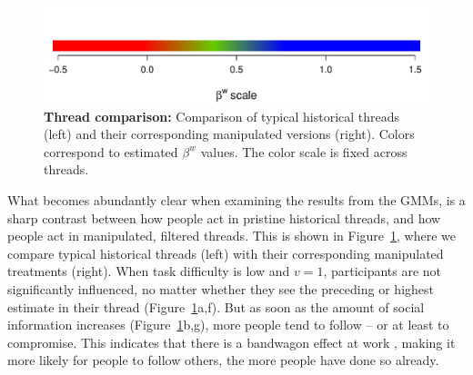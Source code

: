 \documentclass[9pt,a4paper,twocolumn,lineno]{article}
\begin{document}
\begin{figure}
	\includegraphics[width=.5\linewidth]{betascale_horizontal}

	
	\caption{\footnotesize \textbf{Thread comparison:} Comparison of typical historical threads (left) and their corresponding manipulated versions (right). %
	Colors correspond to estimated $\beta^w$ values. The color scale is fixed across threads.}
\label{fig:more}
\end{figure}

What becomes abundantly clear when examining the results from the GMMs, is a sharp contrast between how people act in pristine historical threads, and how people act in manipulated, filtered threads. This is shown in Figure~\ref{fig:more}, where we compare typical historical threads (left) with their corresponding manipulated treatments (right). When task difficulty is low and $v=1$, participants are not significantly influenced, no matter whether they see the preceding or highest estimate in their thread (Figure~\ref{fig:more}a,f). But as soon as the amount of social information increases (Figure~\ref{fig:more}b,g), more people tend to follow – or at least to compromise. This indicates that there is a bandwagon effect at work \cite{bikhchandani1992theory, nadeau1993new, lee2018understanding}, making it more likely for people to follow others, the more people have done so already. 

\end{document}
